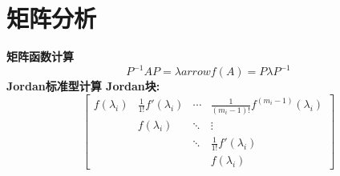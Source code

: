 \section{矩阵分析}
    \bf{矩阵函数计算}
        \[P^{-1} A P = \lambda arrow f(A) = P \lambda P^{-1}\]
        \bf{Jordan标准型计算}
            Jordan块:
            \[[\begin{array}{cccc}
                f(\lambda_i) & \frac{1}{1 !} f'(\lambda_i) & \cdots & \frac{1}{(m_i-1) !} f^{(m_i-1)}(\lambda_i) \\
                & f(\lambda_i) & \ddots & \vdots \\
                & & \ddots & \frac{1}{1 !} f'(\lambda_i) \\
                & & & f(\lambda_i)
            \end{array}]\]




